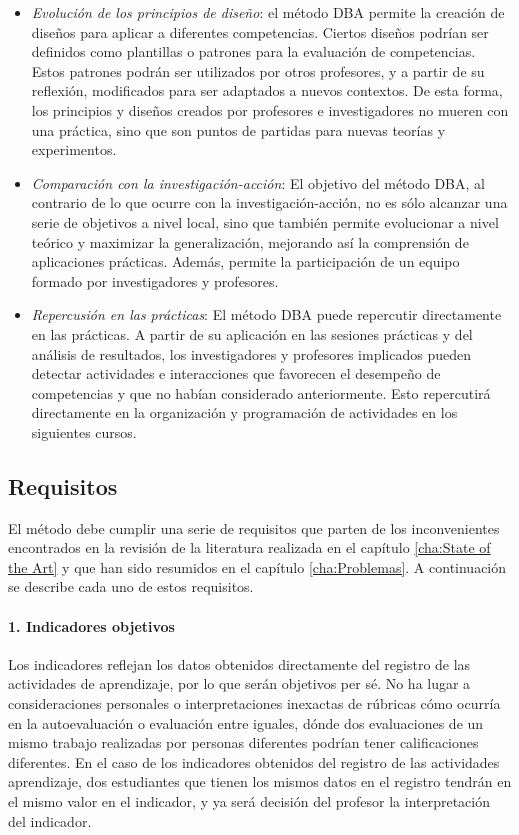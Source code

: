 \begin{itemize}
\item \emph{Evolución de los principios de diseño}: el método DBA permite la creación de diseños para aplicar a diferentes competencias. Ciertos diseños podrían ser definidos como plantillas o patrones para la evaluación de competencias. Estos patrones podrán ser utilizados por otros profesores, y a partir de su reflexión, modificados para ser adaptados a nuevos contextos. De esta forma, los principios y diseños creados por profesores e investigadores no mueren con una práctica, sino que son puntos de partidas para nuevas teorías y experimentos.
\item \emph{Comparación con la investigación-acción}: El objetivo del método DBA, al contrario de lo que ocurre con la investigación-acción, no es sólo alcanzar una serie de objetivos a nivel local, sino que también permite evolucionar a nivel teórico y maximizar la generalización, mejorando así la comprensión de aplicaciones prácticas. Además, permite la participación de un equipo formado por investigadores y profesores.
\item \emph{Repercusión en las prácticas}: El método DBA puede repercutir directamente en las prácticas. A partir de su aplicación en las sesiones prácticas y del análisis de resultados, los investigadores y profesores implicados pueden detectar actividades e interacciones que favorecen el desempeño de competencias y que no habían considerado anteriormente. Esto repercutirá directamente en la organización y programación de actividades en los siguientes cursos.
\end{itemize}

\subsection{Requisitos}

El método debe cumplir una serie de requisitos que parten de los inconvenientes encontrados en la revisión de la literatura realizada en el capítulo \ref{cha:State of the Art} y que han sido resumidos en el capítulo \ref{cha:Problemas}. A continuación se describe cada uno de estos requisitos.

\paragraph*{1. Indicadores objetivos}

Los indicadores reflejan los datos obtenidos directamente del registro de las actividades de aprendizaje, por lo que serán objetivos per sé. No ha lugar a consideraciones personales o interpretaciones inexactas de rúbricas cómo ocurría en la autoevaluación o evaluación entre iguales, dónde dos evaluaciones de un mismo trabajo realizadas por personas diferentes podrían tener calificaciones diferentes. En el caso de los indicadores obtenidos del registro de las actividades aprendizaje, dos estudiantes que tienen los mismos datos en el registro tendrán en el mismo valor en el indicador, y ya será decisión del profesor la interpretación del indicador.

